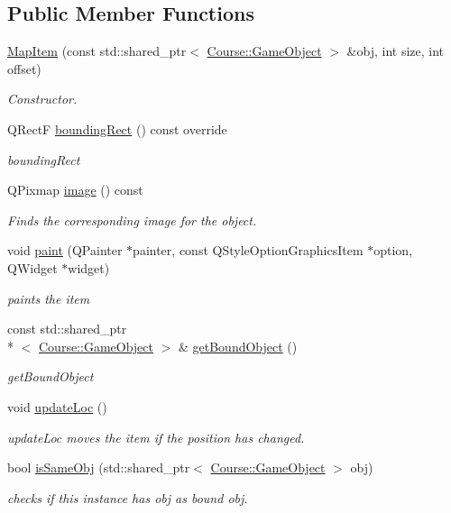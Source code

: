 \subsection*{Public Member Functions}
\begin{DoxyCompactItemize}
\item 
\hyperlink{classGame_1_1MapItem_adab3634fb773e7b185b08b9914bb93e7}{Map\-Item} (const std\-::shared\-\_\-ptr$<$ \hyperlink{classCourse_1_1GameObject}{Course\-::\-Game\-Object} $>$ \&obj, int size, int offset)
\begin{DoxyCompactList}\small\item\em Constructor. \end{DoxyCompactList}\item 
Q\-Rect\-F \hyperlink{classGame_1_1MapItem_a564c803217c15efdd414bc47bc385d94}{bounding\-Rect} () const override
\begin{DoxyCompactList}\small\item\em bounding\-Rect \end{DoxyCompactList}\item 
Q\-Pixmap \hyperlink{classGame_1_1MapItem_a1cbdeaa3793d5c9ba65d792ca44cfad2}{image} () const 
\begin{DoxyCompactList}\small\item\em Finds the corresponding image for the object. \end{DoxyCompactList}\item 
void \hyperlink{classGame_1_1MapItem_a8e18b37b2f48bf586b650dd97bfd03e4}{paint} (Q\-Painter $\ast$painter, const Q\-Style\-Option\-Graphics\-Item $\ast$option, Q\-Widget $\ast$widget)
\begin{DoxyCompactList}\small\item\em paints the item \end{DoxyCompactList}\item 
const std\-::shared\-\_\-ptr\\*
$<$ \hyperlink{classCourse_1_1GameObject}{Course\-::\-Game\-Object} $>$ \& \hyperlink{classGame_1_1MapItem_aa61f3c3867a3805669210c259b2f573e}{get\-Bound\-Object} ()
\begin{DoxyCompactList}\small\item\em get\-Bound\-Object \end{DoxyCompactList}\item 
void \hyperlink{classGame_1_1MapItem_a5bd976eefca99e0ff2f8767d7f1c5c03}{update\-Loc} ()
\begin{DoxyCompactList}\small\item\em update\-Loc moves the item if the position has changed. \end{DoxyCompactList}\item 
bool \hyperlink{classGame_1_1MapItem_a1183a2283108cead408f52d36e53a41b}{is\-Same\-Obj} (std\-::shared\-\_\-ptr$<$ \hyperlink{classCourse_1_1GameObject}{Course\-::\-Game\-Object} $>$ obj)
\begin{DoxyCompactList}\small\item\em checks if this instance has obj as bound obj. \end{DoxyCompactList}\end{DoxyCompactItemize}
